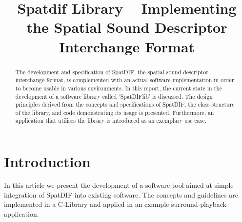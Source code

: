 \documentclass[a4paper]{article}
\title{Spatdif Library -- Implementing the Spatial Sound Descriptor Interchange Format}
\begin{document}
%

\newcommand{\red}[1]{\textcolor{red}{#1}}
\newcommand{\todo}[1]{\noindent\textcolor{red}{[\underline{TODO}: #1]}}

\makeatletter 
\def\ps@myheadings{%
\let\ps@jpl@in\ps@plain%
\def\@evenhead{\reset@font\hfil\leftmark\hfil}%
\def\@oddhead{\reset@font\hfil\rightmark\hfil}%
\let\@mkboth\@gobbletwo%
\let\sectionmark\@gobble%
\let\subsectionmark\@gobble%
% 
\def\@oddfoot{\reset@font\hfil-- \thepage --\hfil}%
\let\@evenfoot\@oddfoot 
} 
\makeatother 
\setcounter{page}{1} 
\pagestyle{myheadings} 
\maketitle
\thispagestyle{myheadings}
\sloppy
{}

\begin{abstract}

The development and specification of SpatDIF, the spatial sound descriptor interchange format, is complemented with an actual software implementation in order to become usable in various environments. 
In this report, the current state in the development of a software library called `SpatDIFlib' is discussed.
The design principles derived from the concepts and specifications of SpatDIF, the class structure of the library, and code demonstrating its usage is presented.
Furthermore, an application that utilises the library is introduced as an exemplary use case.

\end{abstract}

\section{Introduction}

In this article we present the development of a software tool aimed at simple integration of SpatDIF into existing software.
The concepts and guidelines are implemented in a C-Library and applied in an example surround-playback application.
\end{document}
